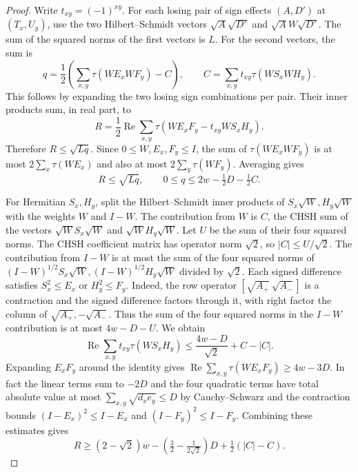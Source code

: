 \begin{proof}
Write $t_{xy}=(-1)^{xy}$. For each losing pair of sign effects $(A,D')$ at
$(T_x,U_y)$, use the two Hilbert--Schmidt vectors $\sqrt A\sqrt{D'}$ and
$\sqrt A W\sqrt{D'}$. The sum of the squared norms of the first vectors is
$L$. For the second vectors, the sum is
\[
 q=\frac12\left(\sum_{x,y}\tau(WE_xWF_y)-C\right),\qquad
 C=\sum_{x,y}t_{xy}\tau(WS_xWH_y).
\]
This follows by expanding the two losing sign combinations per pair.
Their inner products sum, in real part, to
\[
 R=\frac12\operatorname{Re}\sum_{x,y}\tau(W E_xF_y-t_{xy}W S_xH_y).
\]
Therefore $R\le\sqrt{Lq}$. Since $0\le W,E_x,F_y\le I$, the sum of
$\tau(WE_xWF_y)$ is at most $2\sum_x\tau(WE_x)$ and also at most
$2\sum_y\tau(WF_y)$. Averaging gives
\begin{equation}\label{eq:tracial-sign-cs}
 R\le\sqrt{Lq},\qquad 0\le q\le 2w-\tfrac12 D-\tfrac12 C.
\end{equation}

For Hermitian $S_x,H_y$, split the Hilbert--Schmidt inner products of
$S_x\sqrt W,H_y\sqrt W$ with the weights $W$ and $I-W$. The contribution
from $W$ is $C$, the CHSH sum of the vectors $\sqrt W S_x\sqrt W$ and
$\sqrt W H_y\sqrt W$. Let $U$ be the sum of their four squared norms.
The CHSH coefficient matrix has operator norm $\sqrt2$, so
$|C|\le U/\sqrt2$. The contribution from $I-W$ is at most the sum of
the four squared norms of $(I-W)^{1/2}S_x\sqrt W,(I-W)^{1/2}H_y\sqrt W$
divided by $\sqrt2$. Each signed difference satisfies $S_x^2\le E_x$ or
$H_y^2\le F_y$. Indeed, the row operator $[\sqrt{A_+}\ \sqrt{A_-}]$ is a
contraction and the signed difference factors through it, with right factor
the column of $\sqrt{A_+},-\sqrt{A_-}$. Thus the sum of the four squared
norms in the $I-W$ contribution is at most $4w-D-U$. We obtain
\[
 \operatorname{Re}\sum_{x,y}t_{xy}\tau(W S_xH_y)
 \le \frac{4w-D}{\sqrt2}+C-|C|.
\]
Expanding $E_xF_y$ around the identity gives
$\operatorname{Re}\sum_{x,y}\tau(W E_xF_y)\ge4w-3D$. In fact the linear
terms sum to $-2D$ and the four quadratic terms have total absolute value
at most $\sum_{x,y}\sqrt{d_xe_y}\le D$ by Cauchy--Schwarz and the
contraction bounds $(I-E_x)^2\le I-E_x$ and $(I-F_y)^2\le I-F_y$.
Combining these estimates gives
\[
 R\ge (2-\sqrt2)w-\left(\tfrac32-\tfrac1{2\sqrt2}\right)D
                  +\tfrac12(|C|-C).
\]


\end{proof}
